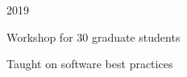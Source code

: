 


\vspace{\baselineskip}

 \hfill 2019
\begin{outerlist}
    \item Workshop for 30 graduate students
    \item Taught on software best practices
\end{outerlist}


